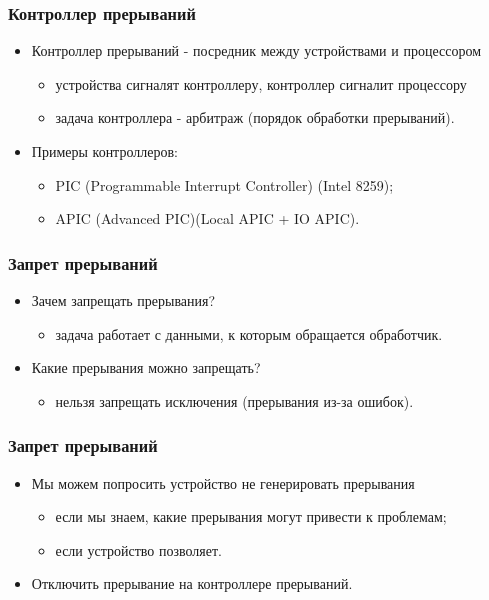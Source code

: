 \begin{frame}
\frametitle{Контроллер прерываний}
\begin{itemize}
    \item<1->Контроллер прерываний - посредник между устройствами и процессором
    \begin{itemize}
        \item<2->устройства сигналят контроллеру, контроллер сигналит процессору
        \item<3->задача контроллера - арбитраж (порядок обработки прерываний).
    \end{itemize}
    \item<4->Примеры контроллеров:
    \begin{itemize}
        \item PIC (Programmable Interrupt Controller) (Intel 8259);
        \item APIC (Advanced PIC)(Local APIC + IO APIC).
    \end{itemize}
\end{itemize}
\end{frame}

\begin{frame}
\frametitle{Запрет прерываний}
\begin{itemize}
    \item<1->Зачем запрещать прерывания?
    \begin{itemize}
        \item задача работает с данными, к которым обращается обработчик.
    \end{itemize}
    \item<2->Какие прерывания можно запрещать?
    \begin{itemize}
        \item нельзя запрещать исключения (прерывания из-за ошибок).
    \end{itemize}
\end{itemize}
\end{frame}

\begin{frame}
\frametitle{Запрет прерываний}
\begin{itemize}
    \item<1->Мы можем попросить устройство не генерировать прерывания
    \begin{itemize}
        \item если мы знаем, какие прерывания могут привести к проблемам;
        \item если устройство позволяет.
    \end{itemize}
    \item<2->Отключить прерывание на контроллере прерываний.
\end{itemize}
\end{frame}


